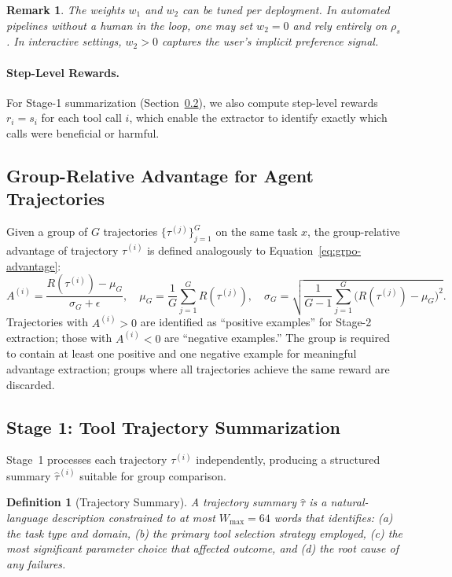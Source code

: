 \documentclass[11pt]{article}
\newtheorem{definition}{Definition}
\newtheorem{remark}{Remark}
\begin{document}
\begin{remark}
The weights $w_1$ and $w_2$ can be tuned per deployment. In automated
pipelines without a human in the loop, one may set $w_2 = 0$ and rely
entirely on $\rho_s$. In interactive settings, $w_2 > 0$ captures the
user's implicit preference signal.
\end{remark}

\paragraph{Step-Level Rewards.}
For Stage-1 summarization (Section~\ref{sec:stage1}), we also compute step-level
rewards $r_i = s_i$ for each tool call $i$, which enable the extractor to
identify exactly which calls were beneficial or harmful.

\subsection{Group-Relative Advantage for Agent Trajectories}

Given a group of $G$ trajectories $\{\tau^{(j)}\}_{j=1}^G$ on the same task
$x$, the group-relative advantage of trajectory $\tau^{(i)}$ is defined
analogously to Equation~\eqref{eq:grpo-advantage}:
\begin{equation}
    A^{(i)} = \frac{R(\tau^{(i)}) - \mu_G}{\sigma_G + \epsilon},
    \quad \mu_G = \frac{1}{G}\sum_{j=1}^G R(\tau^{(j)}),
    \quad \sigma_G = \sqrt{\frac{1}{G-1}\sum_{j=1}^G \bigl(R(\tau^{(j)}) - \mu_G\bigr)^2}.
    \label{eq:agent-advantage}
\end{equation}
Trajectories with $A^{(i)} > 0$ are identified as ``positive examples'' for
Stage-2 extraction; those with $A^{(i)} < 0$ are ``negative examples.'' The
group is required to contain at least one positive and one negative example for
meaningful advantage extraction; groups where all trajectories achieve the same
reward are discarded.

\subsection{Stage 1: Tool Trajectory Summarization}
\label{sec:stage1}

Stage~1 processes each trajectory $\tau^{(i)}$ independently, producing a
structured summary $\hat{\tau}^{(i)}$ suitable for group comparison.

\begin{definition}[Trajectory Summary]
A trajectory summary $\hat{\tau}$ is a natural-language description constrained
to at most $W_{\max} = 64$ words that identifies: (a) the task type and domain,
(b) the primary tool selection strategy employed, (c) the most significant
parameter choice that affected outcome, and (d) the root cause of any failures.
\end{definition}
\end{document}
